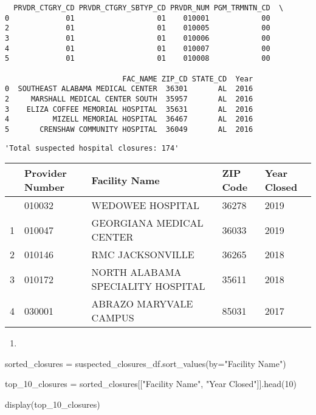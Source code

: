\documentclass[
  letterpaper,
  DIV=11,
  numbers=noendperiod]{scrartcl}
\newenvironment{Shaded}{\begin{snugshade}}{\end{snugshade}}
\newcommand{\DecValTok}[1]{\textcolor[rgb]{0.68,0.00,0.00}{#1}}
\newcommand{\NormalTok}[1]{\textcolor[rgb]{0.00,0.23,0.31}{#1}}
\newcommand{\OperatorTok}[1]{\textcolor[rgb]{0.37,0.37,0.37}{#1}}
\newcommand{\StringTok}[1]{\textcolor[rgb]{0.13,0.47,0.30}{#1}}
\providecommand{\tightlist}{%
  \setlength{\itemsep}{0pt}\setlength{\parskip}{0pt}}\usepackage{longtable,booktabs,array}
\begin{document}
\begin{verbatim}
  PRVDR_CTGRY_CD PRVDR_CTGRY_SBTYP_CD PRVDR_NUM PGM_TRMNTN_CD  \
0             01                   01    010001            00   
2             01                   01    010005            00   
3             01                   01    010006            00   
4             01                   01    010007            00   
5             01                   01    010008            00   

                           FAC_NAME ZIP_CD STATE_CD  Year  
0  SOUTHEAST ALABAMA MEDICAL CENTER  36301       AL  2016  
2     MARSHALL MEDICAL CENTER SOUTH  35957       AL  2016  
3    ELIZA COFFEE MEMORIAL HOSPITAL  35631       AL  2016  
4          MIZELL MEMORIAL HOSPITAL  36467       AL  2016  
5       CRENSHAW COMMUNITY HOSPITAL  36049       AL  2016  
\end{verbatim}

\begin{verbatim}
'Total suspected hospital closures: 174'
\end{verbatim}

\begin{longtable}[]{@{}lllll@{}}
\toprule\noalign{}
& Provider Number & Facility Name & ZIP Code & Year Closed \\
\midrule\noalign{}
\endhead
\bottomrule\noalign{}
\endlastfoot
0 & 010032 & WEDOWEE HOSPITAL & 36278 & 2019 \\
1 & 010047 & GEORGIANA MEDICAL CENTER & 36033 & 2019 \\
2 & 010146 & RMC JACKSONVILLE & 36265 & 2018 \\
3 & 010172 & NORTH ALABAMA SPECIALITY HOSPITAL & 35611 & 2018 \\
4 & 030001 & ABRAZO MARYVALE CAMPUS & 85031 & 2017 \\
\end{longtable}

\begin{enumerate}
\def\labelenumi{\arabic{enumi}.}
\setcounter{enumi}{1}
\tightlist
\item
\end{enumerate}

\begin{Shaded}
\begin{Highlighting}[]
\NormalTok{sorted\_closures }\OperatorTok{=}\NormalTok{ suspected\_closures\_df.sort\_values(by}\OperatorTok{=}\StringTok{"Facility Name"}\NormalTok{)}

\NormalTok{top\_10\_closures }\OperatorTok{=}\NormalTok{ sorted\_closures[[}\StringTok{"Facility Name"}\NormalTok{, }\StringTok{"Year Closed"}\NormalTok{]].head(}\DecValTok{10}\NormalTok{)}

\NormalTok{display(top\_10\_closures)}
\end{Highlighting}
\end{Shaded}
\end{document}
